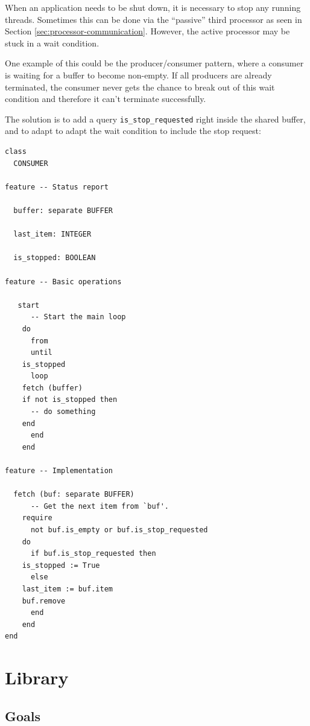 \documentclass[a4paper,10pt]{article}
\begin{document}
When an application needs to be shut down, it is necessary to stop any running threads.
Sometimes this can be done via the ``passive'' third processor as seen in Section \ref{sec:processor-communication}.
However, the active processor may be stuck in a wait condition.

One example of this could be the producer/consumer pattern, where a consumer is waiting for a buffer to become non-empty.
If all producers are already terminated, the consumer never gets the chance to break out of this wait condition and therefore it can't terminate successfully.

The solution is to add a query \lstinline!is_stop_requested! right inside the shared buffer, and to adapt to adapt the wait condition to include the stop request:

\begin{lstlisting}[language=OOSC2Eiffel, captionpos=b, caption={Breaking out of a wait condition.}]
class
  CONSUMER

feature -- Status report

  buffer: separate BUFFER
  
  last_item: INTEGER
  
  is_stopped: BOOLEAN
  
feature -- Basic operations
  
   start
      -- Start the main loop
    do
      from 
      until 
	is_stopped
      loop
	fetch (buffer)
	if not is_stopped then
	  -- do something
	end
      end
    end
  
feature -- Implementation

  fetch (buf: separate BUFFER)
      -- Get the next item from `buf'.
    require
      not buf.is_empty or buf.is_stop_requested
    do
      if buf.is_stop_requested then
	is_stopped := True
      else
	last_item := buf.item
	buf.remove
      end
    end
end
\end{lstlisting}


\section {Library}
\label{sec:library}

 
\subsection{Goals}
\label{sec:goals}
\end{document}
